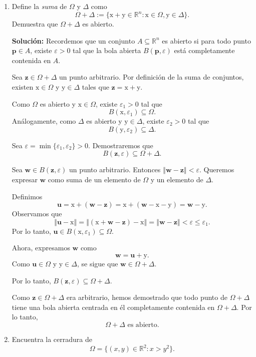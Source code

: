 \documentclass[12pt]{article}
\newcommand{\norm}[1]{\left\Vert#1\right\Vert}
\newcommand{\R}{\mathbb R}
\newcommand{\x}{\mathrm x}
\newcommand{\y}{\mathrm y}
\begin{document}
\begin{enumerate}
\item Define la \emph{suma} de $\Omega$ y $\Delta$ como
\[ \Omega + \Delta := \{ \x+\y\in \R^n : \x\in \Omega, \y\in \Delta \}. \]
Demuestra que $\Omega + \Delta$ es abierto.

\textbf{Solución: } Recordemos que un conjunto $A \subseteq \R^n$ es abierto si para todo punto $\mathbf{p} \in A$, existe $\varepsilon > 0$ tal que la bola abierta $B(\mathbf{p}, \varepsilon)$ está completamente contenida en $A$.

Sea $\mathbf{z} \in \Omega + \Delta$ un punto arbitrario. Por definición de la suma de conjuntos, existen $\x \in \Omega$ y $\y \in \Delta$ tales que $\mathbf{z} = \x + \y$.

Como $\Omega$ es abierto y $\x \in \Omega$, existe $\varepsilon_1 > 0$ tal que
\[
B(\x, \varepsilon_1) \subseteq \Omega.
\]
Análogamente, como $\Delta$ es abierto y $\y \in \Delta$, existe $\varepsilon_2 > 0$ tal que
\[
B(\y, \varepsilon_2) \subseteq \Delta.
\]

Sea $\varepsilon = \min\{\varepsilon_1, \varepsilon_2\} > 0$. Demostraremos que
\[
B(\mathbf{z}, \varepsilon) \subseteq \Omega + \Delta.
\]

Sea $\mathbf{w} \in B(\mathbf{z}, \varepsilon)$ un punto arbitrario. Entonces $\norm{\mathbf{w} - \mathbf{z}} < \varepsilon$. Queremos expresar $\mathbf{w}$ como suma de un elemento de $\Omega$ y un elemento de $\Delta$.

Definimos
\[
\mathbf{u} = \x + (\mathbf{w} - \mathbf{z}) = \x + (\mathbf{w} - \x - \y) = \mathbf{w} - \y.
\]
Observamos que
\[
\norm{\mathbf{u} - \x} = \norm{(\x + \mathbf{w} - \mathbf{z}) - \x} = \norm{\mathbf{w} - \mathbf{z}} < \varepsilon \leq \varepsilon_1.
\]
Por lo tanto, $\mathbf{u} \in B(\x, \varepsilon_1) \subseteq \Omega$.

Ahora, expresamos $\mathbf{w}$ como
\[
\mathbf{w} = \mathbf{u} + \y.
\]
Como $\mathbf{u} \in \Omega$ y $\y \in \Delta$, se sigue que $\mathbf{w} \in \Omega + \Delta$.

Por lo tanto, $B(\mathbf{z}, \varepsilon) \subseteq \Omega + \Delta$.

Como $\mathbf{z} \in \Omega + \Delta$ era arbitrario, hemos demostrado que todo punto de $\Omega + \Delta$ tiene una bola abierta centrada en él completamente contenida en $\Omega + \Delta$. Por lo tanto,
\[
\Omega + \Delta \text{ es abierto.}
\]

\item Encuentra la cerradura de 
\[ \Omega = \{ (x,y)\in \R^2 : x > y^2 \}. \]


\end{enumerate}
\end{document}

